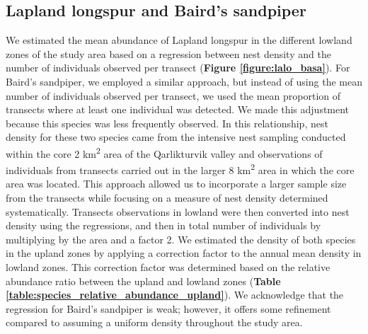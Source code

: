 \documentclass[a4paper,twoside,10pt]{article}
\begin{document}
\subsection{Lapland longspur and Baird's sandpiper}
We estimated the mean abundance of Lapland longspur in the different lowland zones of the study area based on a regression between nest density and the number of individuals observed per transect (\textbf{Figure \ref{figure:lalo_basa}}). For Baird’s sandpiper, we employed a similar approach, but instead of using the mean number of individuals observed per transect, we used the mean proportion of transects where at least one individual was detected. We made this adjustment because this species was less frequently observed. In this relationship, nest density for these two species came from the intensive nest sampling conducted within the core 2 km\textsuperscript{2} area of the Qarlikturvik valley and observations of individuals from transects carried out in the larger 8 km\textsuperscript{2} area in which the core area was located. This approach allowed us to incorporate a larger sample size from the transects while focusing on a measure of nest density determined systematically. Transects observations in lowland were then converted into nest density using the regressions, and then in total number of individuals by multiplying by the area and a factor 2. We estimated the density of both species in the upland zones by applying a correction factor to the annual mean density in lowland zones. This correction factor was determined based on the relative abundance ratio between the upland and lowland zones (\textbf{Table \ref{table:species_relative_abundance_upland}}). We acknowledge that the regression for Baird’s sandpiper is weak; however, it offers some refinement compared to assuming a uniform density throughout the study area. 
\end{document}
